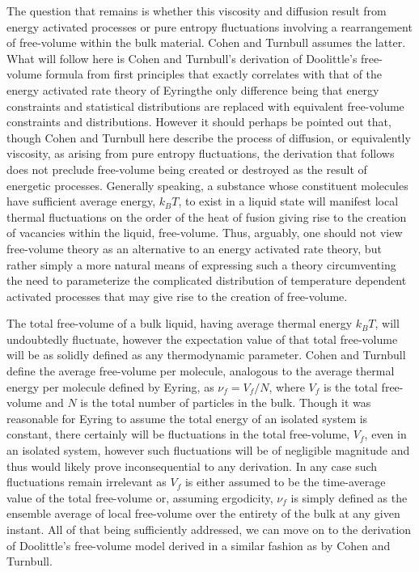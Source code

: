 The question that remains is whether this viscosity and diffusion result from energy activated processes or pure entropy fluctuations involving a rearrangement of free-volume within the bulk material.  Cohen and Turnbull assumes the latter.  What will follow here is Cohen and Turnbull's derivation of Doolittle's free-volume formula from first principles that exactly correlates with that of the energy activated rate theory of Eyring\textemdash the only difference being that energy constraints and statistical distributions are replaced with equivalent free-volume constraints and distributions.  However it should perhaps be pointed out that, though Cohen and Turnbull here describe the process of diffusion, or equivalently viscosity, as arising from pure entropy fluctuations, the derivation that follows does not preclude free-volume being created or destroyed as the result of energetic processes.  Generally speaking, a substance whose constituent molecules have sufficient average energy, $k_B T$, to exist in a liquid state will manifest local thermal fluctuations on the order of the heat of fusion giving rise to the creation of vacancies within the liquid\textemdash \ie, free-volume.  Thus, arguably, one should not view free-volume theory as an alternative to an energy activated rate theory, but rather simply a more natural means of expressing such a theory \via circumventing the need to parameterize the complicated distribution of temperature dependent activated processes that may give rise to the creation of free-volume.

The total free-volume of a bulk liquid, having average thermal energy $k_B T$, will undoubtedly fluctuate, however the expectation value of that total free-volume will be as solidly defined as any thermodynamic parameter.  Cohen and Turnbull define the average free-volume per molecule, analogous to the average thermal energy per molecule defined by Eyring, as $\nu_f=V_f/N$, where $V_f$ is the total free-volume and $N$ is the total number of particles in the bulk.  Though it was reasonable for Eyring to assume the total energy of an isolated system is constant, there certainly will be fluctuations in the total free-volume, $V_f$, even in an isolated system, however such fluctuations will be of negligible magnitude and thus would likely prove inconsequential to any derivation.  In any case such fluctuations remain irrelevant as $V_f$ is either assumed to be the time-average value of the total free-volume or, assuming ergodicity, $\nu_f$ is simply defined as the ensemble average of local free-volume over the entirety of the bulk at any given instant.  All of that being sufficiently addressed, we can move on to the derivation of Doolittle's free-volume model derived in a similar fashion as by Cohen and Turnbull. 

